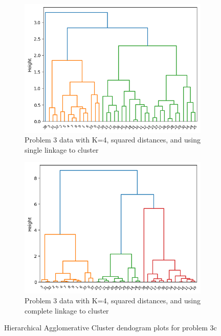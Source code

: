 \documentclass[12pt]{article}
\begin{document}
\begin{figure}
    \begin{subfigure}{0.5\textwidth}
        \centering
        \includegraphics[width=\linewidth]{../plots/3e_average_dendrogram.png}
        \caption{Problem 3 data with K=4, squared distances, and using single linkage to cluster}
    \end{subfigure}
    \begin{subfigure}{0.5\textwidth}
        \centering
        \includegraphics[width=\linewidth]{../plots/3e_average_squared_dendrogram.png}
        \caption{Problem 3 data with K=4, squared distances, and using complete linkage to cluster}
    \end{subfigure}
    \caption{Hierarchical Agglomerative Cluster dendogram plots for problem 3c}\label{fig:3e_den}
\end{figure}
\end{document}
